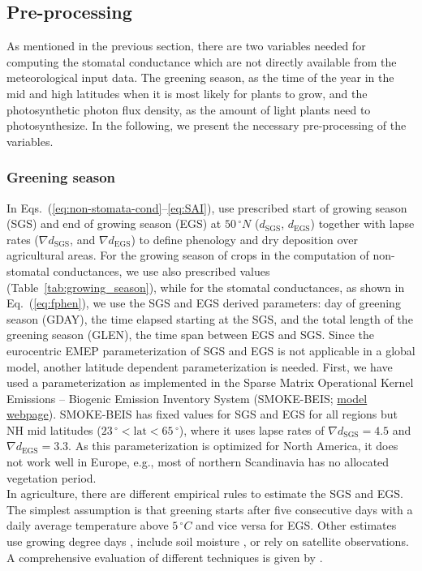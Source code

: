 \documentclass[gmd, manuscript]{copernicus}
\begin{document}
\subsection{Pre-processing}
\label{subsec:pre-pro}
As mentioned in the previous section, there are two variables needed for computing the stomatal conductance which are not directly available from the meteorological input data. The greening season, as the time of the year in the mid and high latitudes when it is most likely for plants to grow, and the photosynthetic photon flux density, as the amount of light plants need to photosynthesize. In the following, we present the necessary pre-processing of the variables.
\subsubsection{Greening season}
\label{subsubsec:greening}
In Eqs.~(\ref{eq:non-stomata-cond}--\ref{eq:SAI}), \citet{ACP:Simpson2012} use prescribed start of growing season (SGS) and end of growing season (EGS) at $50\,\unit{^\circ N}$ ($d_\text{SGS}$, $d_\text{EGS}$) together with lapse rates ($\nabla d_\text{SGS}$, and $\nabla d_\text{EGS}$) to define phenology and dry deposition over agricultural areas. For the growing season of crops in the computation of non-stomatal conductances, we use also prescribed values (Table~\ref{tab:growing_season}), while for the stomatal conductances, as shown in Eq.~(\ref{eq:fphen}), we use the SGS and EGS derived parameters: day of greening season (GDAY), the time elapsed starting at the SGS, and the total length of the greening season (GLEN), the time span between EGS and SGS. Since the eurocentric EMEP parameterization of SGS and EGS is not applicable in a global model, another latitude dependent parameterization is needed. First, we have used a parameterization as implemented in the Sparse Matrix Operational Kernel Emissions -- Biogenic Emission Inventory System (SMOKE-BEIS; \href{https://www.epa.gov/air-emissions-modeling/biogenic-emission-inventory-system-beis}{model webpage}). SMOKE-BEIS has fixed values for SGS and EGS for all regions but NH mid latitudes ($23\,\unit{^\circ} < \text{lat} < 65\,\unit{^\circ}$), where it uses lapse rates of $\nabla d_\text{SGS} = 4.5$ and $\nabla d_\text{EGS} = 3.3$. As this parameterization is optimized for North America, it does not work well in Europe, e.g., most of northern Scandinavia has no allocated vegetation period.\\ 

In agriculture, there are different empirical rules to estimate the SGS and EGS. The simplest assumption is that greening starts after five consecutive days with a daily average temperature above $5\,\unit{^\circ C}$ and vice versa for EGS. Other estimates use growing degree days \citep{JC:Levis2004,PO:Fu2014}, include soil moisture \citep{GCB:Fu2014}, or rely on satellite observations. A comprehensive evaluation of different techniques is given by \citet{GCB:Anav2017}.
\end{document}
